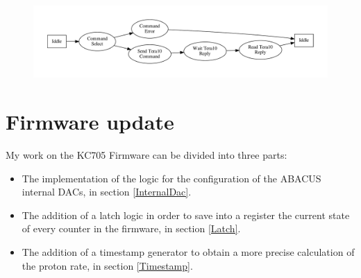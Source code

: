 \begin{figure}[H]
	\centering
	\includegraphics[width=1.0\linewidth]{FSMdiagrams/TERA10controll.pdf}
	\caption{}
	\label{fig:fsmFIFO2}
\end{figure}  

\section{Firmware update}
My work on the KC705 Firmware can be divided into three parts:
\begin{itemize}
	\item The implementation of the logic for the configuration of the ABACUS internal DACs, in section \ref{InternalDac}. 
	\item The addition of a latch logic in order to save into a register the current state of every counter in the firmware, in section \ref{Latch}.
	\item The addition of a timestamp generator to obtain a more precise calculation of the proton rate, in section \ref{Timestamp}. 
\end{itemize}

